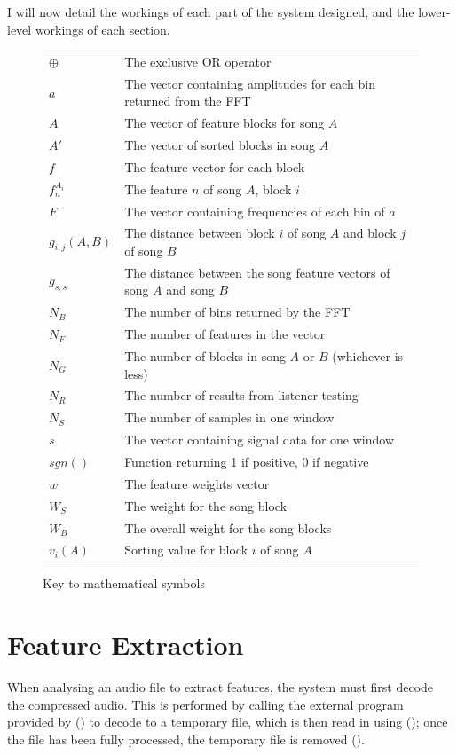 I will now detail the workings of each part of the system designed, and the lower-level workings of each section.
\begin{figure}[ht]
	\caption{Key to mathematical symbols}
	\begin{tabular}{l l}
		$\oplus$		& The exclusive OR operator \\
		$a$				& The vector containing amplitudes for each bin returned from the FFT \\
		$A$				& The vector of feature blocks for song $A$ \\
		$A'$			& The vector of sorted blocks in song $A$ \\
		$f$				& The feature vector for each block \\
		$f_n^{A_{i}}$	& The feature $n$ of song $A$, block $i$ \\
		$F$				& The vector containing frequencies of each bin of $a$ \\
		$g_{i,j}(A,B)$	& The distance between block $i$ of song $A$ and block $j$ of song $B$ \\
		$g_{s,s}$		& The distance between the song feature vectors of song $A$ and song $B$ \\
		$N_B$			& The number of bins returned by the FFT \\
		$N_F$			& The number of features in the vector \\
		$N_G$			& The number of blocks in song $A$ or $B$ (whichever is less) \\
		$N_R$			& The number of results from listener testing \\
		$N_S$			& The number of samples in one window \\
		$s$				& The vector containing signal data for one window \\
		$sgn()$			& Function returning 1 if positive, 0 if negative \\
		$w$				& The feature weights vector \\
		$W_S$			& The weight for the song block \\
		$W_B$			& The overall weight for the song blocks \\
		$v_i(A)$		& Sorting value for block $i$ of song $A$ \\
	\end{tabular}
\end{figure}
\section{Feature Extraction}
When analysing an audio file to extract features, the system must first decode the compressed audio. This is performed by calling the external  program provided by  () to decode to a temporary file, which is then read in using  (); once the file has been fully processed, the temporary file is removed ().

